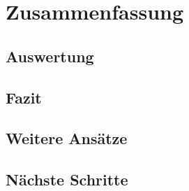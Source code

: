 \chapter{Zusammenfassung}

\section{Auswertung}

\section{Fazit}

\section{Weitere Ansätze}

\section{Nächste Schritte}
